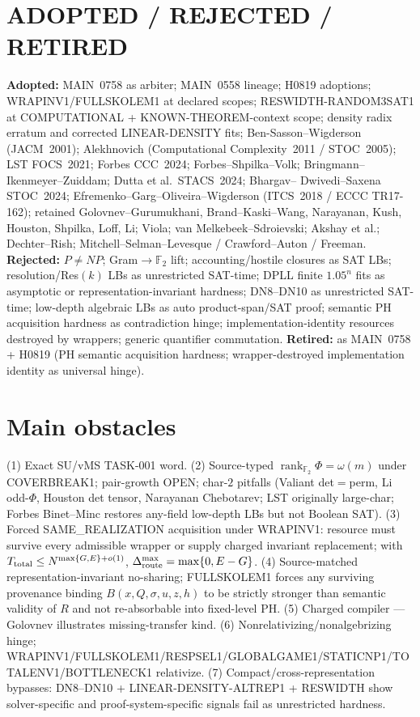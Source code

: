 \documentclass[11pt]{article}
\begin{document}
\section*{ADOPTED / REJECTED / RETIRED}
\textbf{Adopted:} MAIN~0758 as arbiter; MAIN~0558 lineage; H0819 adoptions; WRAPINV1/FULLSKOLEM1
at declared scopes; RESWIDTH-RANDOM3SAT1 at COMPUTATIONAL + KNOWN-THEOREM-context scope;
density radix erratum and corrected LINEAR-DENSITY fits; Ben-Sasson--Wigderson (JACM~2001);
Alekhnovich (Computational Complexity~2011 / STOC~2005); LST FOCS~2021; Forbes CCC~2024;
Forbes--Shpilka--Volk; Bringmann--Ikenmeyer--Zuiddam; Dutta et al.\ STACS~2024; Bhargav--
Dwivedi--Saxena STOC~2024; Efremenko--Garg--Oliveira--Wigderson (ITCS~2018 / ECCC TR17-162);
retained Golovnev--Gurumukhani, Brand--Kaski--Wang, Narayanan, Kush, Houston, Shpilka, Loff, Li;
Viola; van Melkebeek--Sdroievski; Akshay et al.; Dechter--Rish; Mitchell--Selman--Levesque /
Crawford--Auton / Freeman.
\textbf{Rejected:} $P\neq NP$; Gram$\to\mathbb F_2$ lift; accounting/hostile closures as SAT LBs;
resolution/Res$(k)$ LBs as unrestricted SAT-time; DPLL finite $1.05^n$ fits as asymptotic or
representation-invariant hardness; DN8--DN10 as unrestricted SAT-time; low-depth algebraic LBs
as auto product-span/SAT proof; semantic PH acquisition hardness as contradiction hinge;
implementation-identity resources destroyed by wrappers; generic quantifier commutation.
\textbf{Retired:} as MAIN~0758 + H0819 (PH semantic acquisition hardness; wrapper-destroyed
implementation identity as universal hinge).

\section*{Main obstacles}
(1) Exact SU/vMS TASK-001 word. (2) Source-typed
$\operatorname{rank}_{\mathbb F_2}\Phi=\omega(m)$ under COVERBREAK1; pair-growth OPEN;
char-$2$ pitfalls (Valiant det$=$perm, Li odd-$\Phi$, Houston det tensor, Narayanan Chebotarev;
LST originally large-char; Forbes Binet--Minc restores any-field low-depth LBs but not Boolean SAT).
(3) Forced SAME\_REALIZATION acquisition under WRAPINV1: resource must survive every
admissible wrapper or supply charged invariant replacement; with
$T_{\rm total}\le N^{\max\{G,E\}+o(1)}$, $\Delta_{\rm route}^{\max}=\max\{0,E-G\}$.
(4) Source-matched representation-invariant no-sharing; FULLSKOLEM1 forces any surviving
provenance binding $B(x,Q,\sigma,u,z,h)$ to be strictly stronger than semantic validity of $R$
and not re-absorbable into fixed-level PH. (5) Charged compiler --- Golovnev illustrates
missing-transfer kind. (6) Nonrelativizing/nonalgebrizing hinge;
WRAPINV1/FULLSKOLEM1/RESPSEL1/GLOBALGAME1/STATICNP1/TOTALENV1/BOTTLENECK1 relativize.
(7) Compact/cross-representation bypasses: DN8--DN10 + LINEAR-DENSITY-ALTREP1 + RESWIDTH
show solver-specific and proof-system-specific signals fail as unrestricted hardness.
\end{document}
